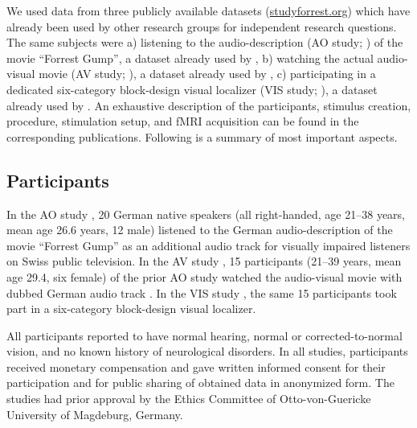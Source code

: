 \documentclass[english]{article}
\begin{document}
We used data from three publicly available datasets
(\href{http://www.studyforrest.org}{studyforrest.org}) which have already been
used by other research groups for independent research questions.
 The same
subjects were
a) listening to the audio-description (AO study; \citep{hanke2014audiomovie}) of
the movie ``Forrest Gump'', a dataset already used by \citep{hu2017decoding,
nguyen2016integration},
b) watching the actual audio-visual movie (AV study;
\citep{hanke2016simultaneous}), a dataset already used by
\citep{ben2018hippocampal},
c) participating in a dedicated six-category block-design visual localizer (VIS
study; \citep{sengupta2016extension}), a dataset already used by
\citep{jiahui2019predicting}.
An exhaustive description of the participants, stimulus creation, procedure,
stimulation setup, and fMRI acquisition can be found in the corresponding
publications. Following is a summary of most important aspects.


\subsection{Participants}
In the AO study \citep{hanke2014audiomovie}, 20 German native speakers (all
right-handed, age 21–38 years, mean age 26.6 years, 12 male) listened to the
German audio-description \citep{ForrestGumpGermanAD} of the movie ``Forrest
Gump'' \citep{ForrestGumpMovie} as an additional audio track for visually
impaired listeners on Swiss public television.
In the AV study \citep{hanke2016simultaneous}, 15 participants (21–39 years,
mean age 29.4, six female) of the prior AO study watched the audio-visual movie
with dubbed German audio track \citep{ForrestGumpDVD}.
In the VIS study \citep{sengupta2016extension}, the same 15 participants took
part in a six-category block-design visual localizer.

All participants reported to have normal hearing, normal or corrected-to-normal
vision, and no known history of neurological disorders.
In all studies, participants received monetary compensation and gave written
informed consent for their participation and for public sharing of obtained data
in anonymized form. The studies had prior approval by the Ethics Committee of
Otto-von-Guericke University of Magdeburg, Germany.
\end{document}

